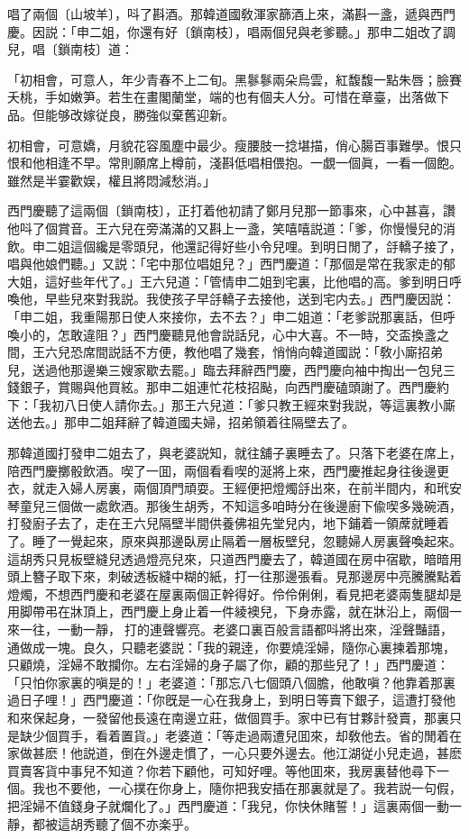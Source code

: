 唱了兩個〔山坡羊〕，呌了斟酒。那韓道國敎渾家篩酒上來，滿斟一盞，遞與西門慶。因説：「申二姐，你還有好〔鎖南枝〕，唱兩個兒與老爹聽。」那申二姐改了調兒，唱〔鎖南枝〕道：

\begin{myquote}
「初相會，可意人，年少青春不上二旬。黑鬖鬖兩朵烏雲，紅馥馥一點朱唇；臉賽夭桃，手如嫩笋。若生在畫閣蘭堂，端的也有個夫人分。可惜在章臺，出落做下品。但能够改嫁従良，勝強似棄舊迎新。

初相會，可意嬌，月貌花容風塵中最少。瘦腰肢一捻堪描，俏心腸百事難學。恨只恨和他相逢不早。常則願席上樽前，淺斟低唱相偎抱。一覷一個眞，一看一個飽。雖然是半霎歡娱，權且將悶減愁消。」
\end{myquote}

西門慶聽了這兩個〔鎖南枝〕，正打着他初請了鄭月兒那一節事來，心中甚喜，讚他呌了個賞音。王六兒在旁滿滿的又斟上一盞，笑嘻嘻説道：「爹，你慢慢兒的消飲。申二姐這個纔是零頭兒，他還記得好些小令兒哩。到明日閒了，㧱轎子接了，唱與他娘們聽。」又説：「宅中那位唱姐兒？」西門慶道：「那個是常在我家走的郁大姐，這好些年代了。」王六兒道：「管情申二姐到宅裏，比他唱的高。爹到明日呼喚他，早些兒來對我説。我使孩子早㧱轎子去接他，送到宅内去。」西門慶因説：「申二姐，我重陽那日使人來接你，去不去？」申二姐道：「老爹説那裏話，但呼喚小的，怎敢違阻？」西門慶聽見他會説話兒，心中大喜。不一時，交盃換盞之間，王六兒恐席間説話不方便，教他唱了幾套，悄悄向韓道國説：「敎小廝招弟兒，送過他那邊樂三嫂家歇去罷。」臨去拜辭西門慶，西門慶向袖中掏出一包兒三錢銀子，賞賜與他買絃。那申二姐連忙花枝招颭，向西門慶磕頭謝了。西門慶約下：「我初八日使人請你去。」那王六兒道：「爹只教王經來對我説，等這裏教小廝送他去。」那申二姐拜辭了韓道國夫婦，招弟領着往隔壁去了。

那韓道國打發申二姐去了，與老婆説知，就往舖子裏睡去了。只落下老婆在席上，陪西門慶擲骰飲酒。喫了一囬，兩個看看喫的涎將上來，西門慶推起身往後邊更衣，就走入婦人房裏，兩個頂門頑耍。王經便把燈燭㧱出來，在前半間内，和玳安琴童兒三個做一處飲酒。那後生胡秀，不知這多咱時分在後邊廚下偸喫多幾碗酒，打發廚子去了，走在王六兒隔壁半間供養佛祖先堂兒内，地下鋪着一領蓆就睡着了。睡了一覺起來，原來與那邊臥房止隔着一層板壁兒，忽聽婦人房裏聲喚起來。這胡秀只見板壁縫兒透過燈亮兒來，只道西門慶去了，韓道國在房中宿歇，暗暗用頭上簪子取下來，刺破透板縫中糊的紙，打一往那邊張看。見那邊房中亮騰騰點着燈燭，不想西門慶和老婆在屋裏兩個正幹得好。伶伶俐俐，看見把老婆兩隻腿却是用脚帶弔在牀頂上，西門慶上身止着一件綾襖兒，下身赤露，就在牀沿上，兩個一來一往，一動一靜，𢵞打的連聲響亮。老婆口裏百般言語都呌將出來，淫聲豔語，通做成一塊。良久，只聽老婆説：「我的親逹，你要燒淫婦，隨你心裏揀着那塊，只顧燒，淫婦不敢攔你。左右淫婦的身子屬了你，顧的那些兒了！」西門慶道：「只怕你家裏的嗔是的！」老婆道：「那忘八七個頭八個膽，他敢嗔？他靠着那裏過日子哩！」西門慶道：「你旣是一心在我身上，到明日等賣下銀子，這遭打發他和來保起身，一發留他長遠在南邊立莊，做個買手。家中已有甘夥計發賣，那裏只是缺少個買手，看着置貨。」老婆道：「等走過兩遭兒囬來，却敎他去。省的閒着在家做甚麽！他説道，倒在外邊走慣了，一心只要外邊去。他江湖従小兒走過，甚麽買賣客貨中事兒不知道？你若下顧他，可知好哩。等他囬來，我房裏替他尋下一個。我也不要他，一心撲在你身上，隨你把我安插在那裏就是了。我若説一句假，把淫婦不值錢身子就爛化了。」西門慶道：「我兒，你快休賭誓！」這裏兩個一動一靜，都被這胡秀聽了個不亦楽乎。

